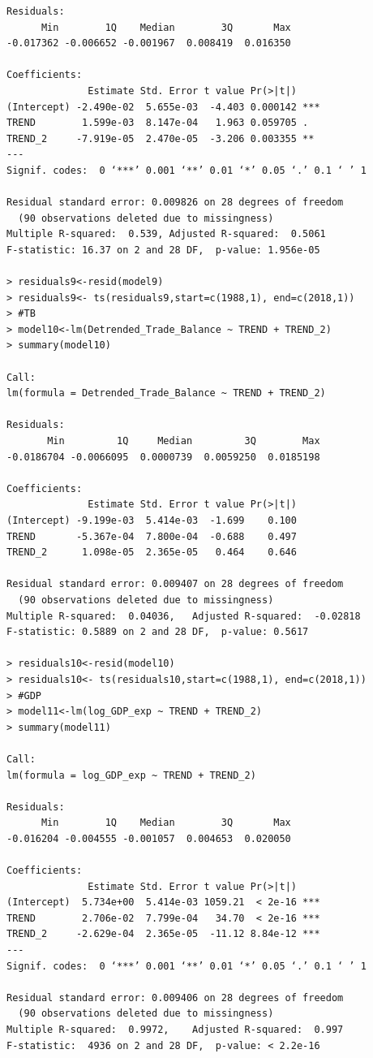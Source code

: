 \documentclass[12pt]{article}
\begin{document}
\begin{verbatim}
Residuals:
      Min        1Q    Median        3Q       Max 
-0.017362 -0.006652 -0.001967  0.008419  0.016350 

Coefficients:
              Estimate Std. Error t value Pr(>|t|)    
(Intercept) -2.490e-02  5.655e-03  -4.403 0.000142 ***
TREND        1.599e-03  8.147e-04   1.963 0.059705 .  
TREND_2     -7.919e-05  2.470e-05  -3.206 0.003355 ** 
---
Signif. codes:  0 ‘***’ 0.001 ‘**’ 0.01 ‘*’ 0.05 ‘.’ 0.1 ‘ ’ 1

Residual standard error: 0.009826 on 28 degrees of freedom
  (90 observations deleted due to missingness)
Multiple R-squared:  0.539,	Adjusted R-squared:  0.5061 
F-statistic: 16.37 on 2 and 28 DF,  p-value: 1.956e-05

> residuals9<-resid(model9)
> residuals9<- ts(residuals9,start=c(1988,1), end=c(2018,1))
> #TB
> model10<-lm(Detrended_Trade_Balance ~ TREND + TREND_2)
> summary(model10)

Call:
lm(formula = Detrended_Trade_Balance ~ TREND + TREND_2)

Residuals:
       Min         1Q     Median         3Q        Max 
-0.0186704 -0.0066095  0.0000739  0.0059250  0.0185198 

Coefficients:
              Estimate Std. Error t value Pr(>|t|)
(Intercept) -9.199e-03  5.414e-03  -1.699    0.100
TREND       -5.367e-04  7.800e-04  -0.688    0.497
TREND_2      1.098e-05  2.365e-05   0.464    0.646

Residual standard error: 0.009407 on 28 degrees of freedom
  (90 observations deleted due to missingness)
Multiple R-squared:  0.04036,	Adjusted R-squared:  -0.02818 
F-statistic: 0.5889 on 2 and 28 DF,  p-value: 0.5617

> residuals10<-resid(model10)
> residuals10<- ts(residuals10,start=c(1988,1), end=c(2018,1))
> #GDP
> model11<-lm(log_GDP_exp ~ TREND + TREND_2)
> summary(model11)

Call:
lm(formula = log_GDP_exp ~ TREND + TREND_2)

Residuals:
      Min        1Q    Median        3Q       Max 
-0.016204 -0.004555 -0.001057  0.004653  0.020050 

Coefficients:
              Estimate Std. Error t value Pr(>|t|)    
(Intercept)  5.734e+00  5.414e-03 1059.21  < 2e-16 ***
TREND        2.706e-02  7.799e-04   34.70  < 2e-16 ***
TREND_2     -2.629e-04  2.365e-05  -11.12 8.84e-12 ***
---
Signif. codes:  0 ‘***’ 0.001 ‘**’ 0.01 ‘*’ 0.05 ‘.’ 0.1 ‘ ’ 1

Residual standard error: 0.009406 on 28 degrees of freedom
  (90 observations deleted due to missingness)
Multiple R-squared:  0.9972,	Adjusted R-squared:  0.997 
F-statistic:  4936 on 2 and 28 DF,  p-value: < 2.2e-16


\end{verbatim}
\end{document}

